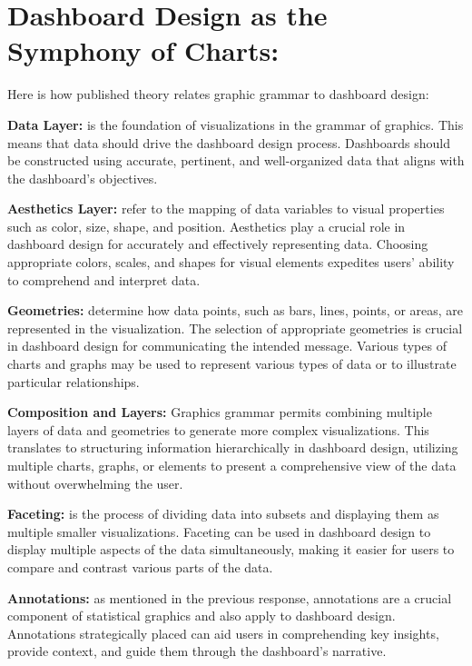 \documentclass[print]{nuthesis}
\begin{document}
\hypertarget{dashboard-design-as-the-symphony-of-charts}{%
\section{Dashboard Design as the Symphony of Charts:}\label{dashboard-design-as-the-symphony-of-charts}}

Here is how published theory relates graphic grammar to dashboard design:

\textbf{Data Layer:} is the foundation of visualizations in the grammar of graphics.
This means that data should drive the dashboard design process.
Dashboards should be constructed using accurate, pertinent, and well-organized data that aligns with the dashboard's objectives.

\textbf{Aesthetics Layer:} refer to the mapping of data variables to visual properties such as color, size, shape, and position.
Aesthetics play a crucial role in dashboard design for accurately and effectively representing data.
Choosing appropriate colors, scales, and shapes for visual elements expedites users' ability to comprehend and interpret data.

\textbf{Geometries:} determine how data points, such as bars, lines, points, or areas, are represented in the visualization.
The selection of appropriate geometries is crucial in dashboard design for communicating the intended message.
Various types of charts and graphs may be used to represent various types of data or to illustrate particular relationships.

\textbf{Composition and Layers:} Graphics grammar permits combining multiple layers of data and geometries to generate more complex visualizations.
This translates to structuring information hierarchically in dashboard design, utilizing multiple charts, graphs, or elements to present a comprehensive view of the data without overwhelming the user.

\textbf{Faceting:} is the process of dividing data into subsets and displaying them as multiple smaller visualizations.
Faceting can be used in dashboard design to display multiple aspects of the data simultaneously, making it easier for users to compare and contrast various parts of the data.

\textbf{Annotations:} as mentioned in the previous response, annotations are a crucial component of statistical graphics and also apply to dashboard design.
Annotations strategically placed can aid users in comprehending key insights, provide context, and guide them through the dashboard's narrative.
\end{document}
